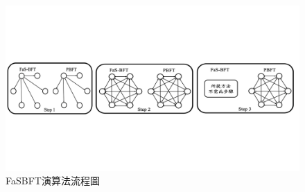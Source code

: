 \begin{figure}[!htbp]
\centering
\includegraphics[scale=0.45]{images/31.png}
\caption{FaSBFT演算法流程圖}
\label{i:byz-latency}
\end{figure}